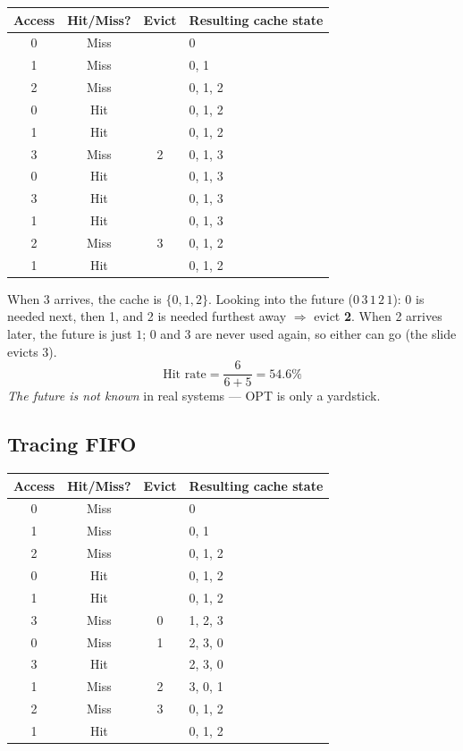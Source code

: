 \documentclass[11pt,a4paper]{article}
\begin{document}
\begin{center}
\renewcommand{\arraystretch}{1.08}
\begin{tabular}{@{}cccl@{}}
  \toprule
  \textbf{Access} & \textbf{Hit/Miss?} & \textbf{Evict} & \textbf{Resulting cache state} \\
  \midrule
  0 & Miss &   & 0 \\
  1 & Miss &   & 0, 1 \\
  2 & Miss &   & 0, 1, 2 \\
  0 & Hit  &   & 0, 1, 2 \\
  1 & Hit  &   & 0, 1, 2 \\
  3 & Miss & 2 & 0, 1, 3 \\
  0 & Hit  &   & 0, 1, 3 \\
  3 & Hit  &   & 0, 1, 3 \\
  1 & Hit  &   & 0, 1, 3 \\
  2 & Miss & 3 & 0, 1, 2 \\
  1 & Hit  &   & 0, 1, 2 \\
  \bottomrule
\end{tabular}
\end{center}

When 3 arrives, the cache is \(\{0,1,2\}\). Looking into the future
(\(0\,3\,1\,2\,1\)): 0 is needed next, then 1, and 2 is needed furthest
away $\Rightarrow$ evict \textbf{2}. When 2 arrives later, the future is
just \(1\); 0 and 3 are never used again, so either can go (the slide
evicts 3).
\[
  \text{Hit rate} = \frac{6}{6+5} = 54.6\%
\]
\emph{The future is not known} in real systems --- OPT is only a
yardstick.

\subsection{Tracing FIFO}

\begin{center}
\renewcommand{\arraystretch}{1.08}
\begin{tabular}{@{}cccl@{}}
  \toprule
  \textbf{Access} & \textbf{Hit/Miss?} & \textbf{Evict} & \textbf{Resulting cache state} \\
  \midrule
  0 & Miss &   & 0 \\
  1 & Miss &   & 0, 1 \\
  2 & Miss &   & 0, 1, 2 \\
  0 & Hit  &   & 0, 1, 2 \\
  1 & Hit  &   & 0, 1, 2 \\
  3 & Miss & 0 & 1, 2, 3 \\
  0 & Miss & 1 & 2, 3, 0 \\
  3 & Hit  &   & 2, 3, 0 \\
  1 & Miss & 2 & 3, 0, 1 \\
  2 & Miss & 3 & 0, 1, 2 \\
  1 & Hit  &   & 0, 1, 2 \\
  \bottomrule
\end{tabular}
\end{center}
\end{document}
